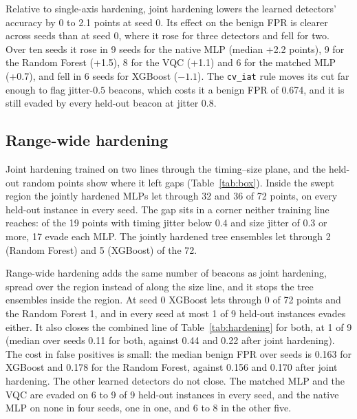 \documentclass[preprint,12pt]{elsarticle}
\begin{document}
Relative to single-axis hardening, joint hardening lowers the learned detectors' accuracy by 0 to 2.1
points at seed 0. Its effect on the benign FPR is clearer across seeds than at seed 0, where it rose for
three detectors and fell for two. Over ten seeds it rose in 9 seeds for the native MLP (median
+2.2 points), 9 for the Random Forest (+1.5), 8 for the VQC (+1.1) and 6 for the matched MLP (+0.7), and
fell in 6 seeds for XGBoost ($-1.1$). The \texttt{cv\_iat} rule moves its cut far enough to flag jitter-$0.5$ beacons, which costs it a
benign FPR of 0.674, and it is still evaded by every held-out beacon at jitter $0.8$.

\subsection{Range-wide hardening}
\label{sec:box}
Joint hardening trained on two lines through the timing--size plane, and the held-out random points
show where it left gaps (Table~\ref{tab:box}). Inside the swept region the jointly hardened MLPs let
through 32 and 36 of 72 points, on every held-out instance in every seed. The gap sits in a corner
neither training line reaches: of the 19 points with timing jitter below $0.4$ and size jitter of $0.3$
or more, 17 evade each MLP. The jointly hardened tree ensembles let through 2 (Random Forest) and 5
(XGBoost) of the 72.

Range-wide hardening adds the same number of beacons as joint hardening, spread over the region instead
of along the size line, and it stops the tree ensembles inside the region. At seed 0 XGBoost lets
through 0 of 72 points and the Random Forest 1, and in every seed at most 1 of 9 held-out instances
evades either. It also closes the combined line of Table~\ref{tab:hardening} for both, at 1 of 9 (median
over seeds 0.11 for both, against 0.44 and 0.22 after joint hardening). The cost in false positives is
small: the median benign FPR over seeds is 0.163 for XGBoost and 0.178 for the Random Forest, against
0.156 and 0.170 after joint hardening. The other learned detectors do not close. The matched MLP and the
VQC are evaded on 6 to 9 of 9 held-out instances in every seed, and the native MLP on none in four
seeds, one in one, and 6 to 8 in the other five.
\end{document}
